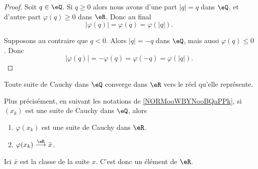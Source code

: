 \begin{proof}
	Soit \( q\in \eQ\). Si \( q\geq 0\) alors nous avons d'une part \( | q |=q\) dans \( \eQ\), et d'autre part \( \varphi(q)\geq 0\) dans \( \eR\). Donc au final
	\begin{equation}
		| \varphi(q) |=\varphi(q)=\varphi(| q |).
	\end{equation}

	Supposons au contraire que \( q<0\). Alors \( | q |=-q\) dans \( \eQ\), mais aussi \( \varphi(q)\leq 0\). Donc
	\begin{equation}
		| \varphi(q) |=-\varphi(q)=\varphi(-q)=\varphi(| q |).
	\end{equation}
\end{proof}

\begin{lemma}      \label{LemooRTGFooYVstwS}
	Toute suite de Cauchy dans \( \eQ\) converge dans \( \eR\) vers le réel qu'elle représente.

	Plus précisément, en suivant les notations de \ref{NORMooWBYNooBQaPPk}, si \( (x_k)\) est une suite de Cauchy dans \( \eQ\), alors
	\begin{enumerate}
		\item
		      \( \varphi(x_k)\) est une suite de Cauchy dans \( \eR\).
		\item
		      \( \varphi(x_k)\stackrel{\eR}{\longrightarrow}\bar x\).
	\end{enumerate}
	Ici \( \bar x\) est la classe de la suite \( x\). C'est donc un élément de \( \eR\).
\end{lemma}


